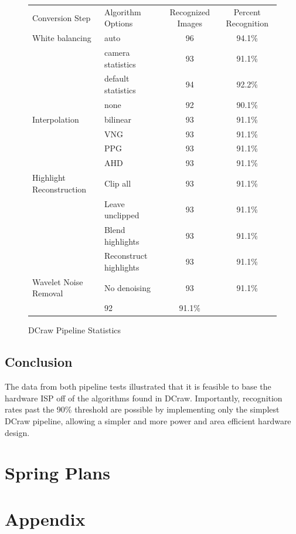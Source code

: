 \documentclass{report}
\begin{document}
	\begin{figure}
		\begin{center}
			\label{datapipeline}
			\caption{DCraw Pipeline Statistics}
			\begin{tabular}{llcc}
				Conversion Step & Algorithm Options & Recognized Images & Percent Recognition \\
				White balancing & auto & 96 & 94.1\%\\
				& camera statistics & 93 & 91.1\%\\
				& default statistics & 94 & 92.2\%\\
				& none & 92 & 90.1\%\\
				Interpolation & bilinear & 93 & 91.1\%\\
				& VNG & 93 & 91.1\%\\
				& PPG & 93 & 91.1\%\\
				& AHD & 93 & 91.1\%\\
				Highlight Reconstruction & Clip all & 93 & 91.1\%\\
				& Leave unclipped & 93 & 91.1\%\\
				& Blend highlights & 93 & 91.1\%\\
				& Reconstruct highlights & 93 & 91.1\%\\
				Wavelet Noise Removal & No denoising & 93 & 91.1\%\\
				& 92 & 91.1\%
			\end{tabular}
		\end{center}
	\end{figure}
	
	\section{Conclusion}
	The data from both pipeline tests illustrated that it is feasible to base the hardware ISP off of the algorithms found in DCraw. Importantly, recognition rates past the 90\% threshold are possible by implementing only the simplest DCraw pipeline, allowing a simpler and more power and area efficient hardware design.

\chapter{Spring Plans}

\chapter{Appendix}
\end{document}
